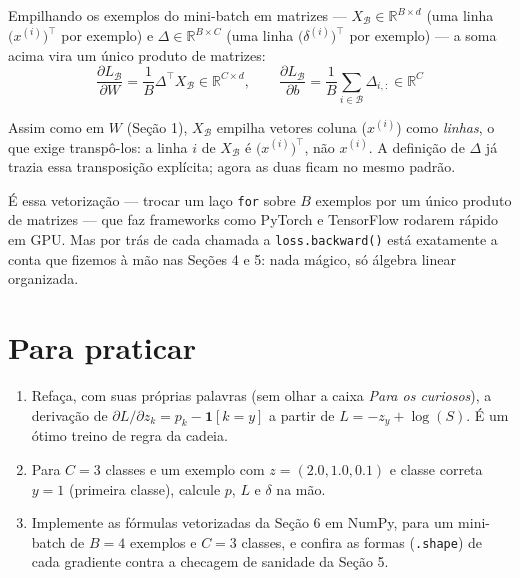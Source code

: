 \documentclass[11pt]{article}
\newcommand{\R}{\mathbb{R}}
\begin{document}
Empilhando os exemplos do mini-batch em matrizes --- $X_{\mathcal{B}} \in \R^{B\times d}$ (uma linha $\big(x^{(i)}\big)^\top$ por exemplo) e $\Delta \in \R^{B\times C}$ (uma linha $\big(\delta^{(i)}\big)^\top$ por exemplo) --- a soma acima vira um único produto de matrizes:
$$
\frac{\partial L_{\mathcal{B}}}{\partial W} = \frac{1}{B}\Delta^\top X_{\mathcal{B}} \in \R^{C\times d}, \qquad
\frac{\partial L_{\mathcal{B}}}{\partial b} = \frac{1}{B}\sum_{i\in\mathcal{B}} \Delta_{i,:} \in \R^C
$$

\begin{revisao}
Assim como em $W$ (Seção 1), $X_{\mathcal{B}}$ empilha vetores coluna ($x^{(i)}$) como \emph{linhas}, o que exige transpô-los: a linha $i$ de $X_{\mathcal{B}}$ é $\big(x^{(i)}\big)^\top$, não $x^{(i)}$. A definição de $\Delta$ já trazia essa transposição explícita; agora as duas ficam no mesmo padrão.
\end{revisao}

\begin{intuicao}
É essa vetorização --- trocar um laço \texttt{for} sobre $B$ exemplos por um único produto de matrizes --- que faz frameworks como PyTorch e TensorFlow rodarem rápido em GPU. Mas por trás de cada chamada a \texttt{loss.backward()} está exatamente a conta que fizemos à mão nas Seções 4 e 5: nada mágico, só álgebra linear organizada.
\end{intuicao}

\section*{Para praticar}
\begin{enumerate}[leftmargin=1.3cm]
  \item Refaça, com suas próprias palavras (sem olhar a caixa \emph{Para os curiosos}), a derivação de $\partial L/\partial z_k = p_k - \mathbf{1}[k=y]$ a partir de $L = -z_y + \log(S)$. É um ótimo treino de regra da cadeia.
  \item Para $C=3$ classes e um exemplo com $z=(2.0, 1.0, 0.1)$ e classe correta $y=1$ (primeira classe), calcule $p$, $L$ e $\delta$ na mão.
  \item Implemente as fórmulas vetorizadas da Seção 6 em NumPy, para um mini-batch de $B=4$ exemplos e $C=3$ classes, e confira as formas (\texttt{.shape}) de cada gradiente contra a checagem de sanidade da Seção 5.
\end{enumerate}
\end{document}
